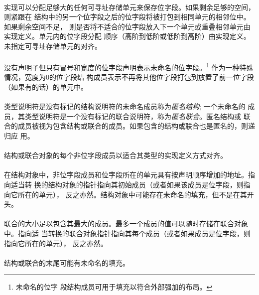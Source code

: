 {\paragraph{}
实现可以分配足够大的任何可寻址存储单元来保存位字段。如果剩余足够的空间，则紧跟在
结构中的另一个位字段之后的位字段将被打包到相同单元的相邻位中。如果剩余空间不足，
则是否将不适合的位字段放入下一个单元或重叠相邻单元由实现定义。单元内的位字段分配
顺序（高阶到低阶或低阶到高阶）由实现定义。未指定可寻址存储单元的对齐。

\paragraph{}
没有声明子但只有冒号和宽度的位字段声明表示未命名的位字段。\footnote{未命名的位字
段结构成员可用于填充以符合外部强加的布局。} 作为一种特殊情况，宽度为0的位字段结
构成员表示不再将其他位字段打包到放置了前一位字段（如果有的话）的单元中。

\paragraph{}
类型说明符是没有标记的结构说明符的未命名成员称为\textit{匿名结构}; 一个未命名的
成员，其类型说明符是一个没有标记的联合说明符，称为\textit{匿名联合}。匿名结构或
联合的成员被视为包含结构或联合的成员。如果包含的结构或联合也是匿名的，则递归应
用。

\paragraph{}
结构或联合对象的每个非位字段成员以适合其类型的实现定义方式对齐。

\paragraph{}
在结构对象中，非位字段成员和位字段所在的单元具有按声明顺序增加的地址。指向适当转
换的结构对象的指针指向其初始成员（或者如果该成员是位字段，则指向它所在的单元），
反之亦然。结构对象中可能存在未命名的填充，但不是在其开头。

\paragraph{}
联合的大小足以包含其最大的成员。最多一个成员的值可以随时存储在联合对象中。指向适
当转换的联合对象指针指向其每个成员（或者如果成员是位字段，则指向它所在的单元），
反之亦然。

\paragraph{}
结构或联合的末尾可能有未命名的填充。

}
